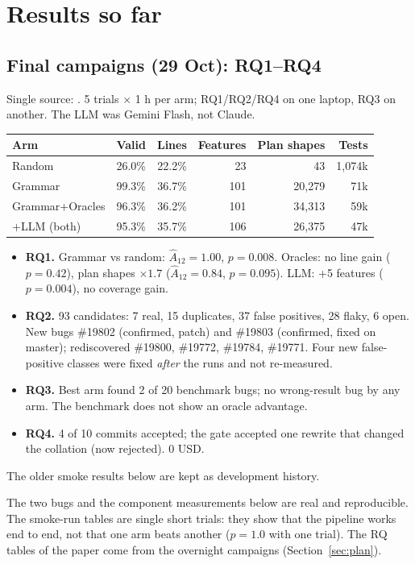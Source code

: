 \section{Results so far}

\subsection{Final campaigns (29 Oct): RQ1--RQ4}
Single source: . 5 trials $\times$ 1 h per arm;
RQ1/RQ2/RQ4 on one laptop, RQ3 on another. The LLM was Gemini Flash, not Claude.
\begin{tabular}{@{}lrrrrr@{}}
\toprule
Arm & Valid & Lines & Features & Plan shapes & Tests \\
\midrule
Random & 26.0\% & 22.2\% & 23 & 43 & 1{,}074k \\
Grammar & 99.3\% & 36.7\% & 101 & 20{,}279 & 71k \\
Grammar+Oracles & 96.3\% & 36.2\% & 101 & 34{,}313 & 59k \\
+LLM (both) & 95.3\% & 35.7\% & 106 & 26{,}375 & 47k \\
\bottomrule
\end{tabular}

\begin{itemize}
  \item \textbf{RQ1.} Grammar vs random: $\hat A_{12}=1.00$, $p=0.008$. Oracles: no
    line gain ($p=0.42$), plan shapes $\times1.7$ ($\hat A_{12}=0.84$, $p=0.095$).
    LLM: +5 features ($p=0.004$), no coverage gain.
  \item \textbf{RQ2.} 93 candidates: 7 real, 15 duplicates, 37 false positives,
    28 flaky, 6 open. New bugs \#19802 (confirmed, patch) and \#19803 (confirmed,
    fixed on master); rediscovered \#19800, \#19772, \#19784, \#19771. Four new
    false-positive classes were fixed \emph{after} the runs and not re-measured.
  \item \textbf{RQ3.} Best arm found 2 of 20 benchmark bugs; no wrong-result bug
    by any arm. The benchmark does not show an oracle advantage.
  \item \textbf{RQ4.} 4 of 10 commits accepted; the gate accepted one rewrite
    that changed the collation (now rejected). 0 USD.
\end{itemize}
The older smoke results below are kept as development history.

\label{sec:results}

\begin{warnbox}
The two bugs and the component measurements below are real and reproducible.
The smoke-run tables are single short trials: they show that the pipeline
works end to end, not that one arm beats another ($p=1.0$ with one trial).
The RQ tables of the paper come from the overnight campaigns (Section~\ref{sec:plan}).
\end{warnbox}

